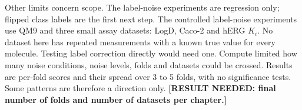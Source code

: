 Other limits concern scope. The label-noise experiments are regression only; flipped class labels are the first next step. The controlled label-noise experiments use QM9 and three small assay datasets: LogD, Caco-2 and hERG $K_i$. No dataset here has repeated measurements with a known true value for every molecule. Testing label correction directly would need one. Compute limited how many noise conditions, noise levels, folds and datasets could be crossed. Results are per-fold scores and their spread over 3 to 5 folds, with no significance tests. Some patterns are therefore a direction only. \textbf{[RESULT NEEDED: final number of folds and number of datasets per chapter.]}
